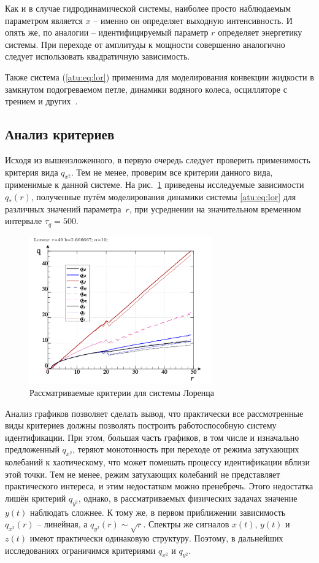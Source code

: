Как и в случае гидродинамической системы, наиболее просто наблюдаемым
параметром является $x$ -- именно он определяет выходную интенсивность. И
опять же, по аналогии -- идентифицируемый параметр $r$ определяет энергетику
системы. При переходе от амплитуды к мощности совершенно аналогично
следует использовать квадратичную зависимость.

Также система (\ref{atu:eq:lor}) применима для
моделирования конвекции жидкости в замкнутом подогреваемом петле,
динамики водяного колеса, осцилляторе с трением и других~\cite{kuznetsov_dyn_chaos}.

\subsection{Анализ критериев}

Исходя из вышеизложенного, в первую очередь следует проверить применимость
критерия вида $q_{x^2}$. Тем не менее, проверим все
критерии данного вида, применимые к данной системе.
На рис.~\ref{atu:f:lor_q} приведены исследуемые зависимости
$q_{*}(r)$, полученные путём моделирования динамики
системы \ref{atu:eq:lor} для различных значений параметра~$r$,
при усреднении на значительном временном интервале $\tau_q=500$.


\begin{figure}[h!]
  \centerline{\includegraphics[width=0.7\textwidth]{p/cha/lor/lor_q-p_q_r.png} }
  \caption{Рассматриваемые критерии для системы Лоренца}
  \label{atu:f:lor_q}
\end{figure}

Анализ графиков позволяет сделать вывод, что практически все
рассмотренные виды критериев должны позволять построить
работоспособную систему идентификации. При этом,
большая часть графиков, в том числе и изначально
предложенный $q_{x^2}$, теряют монотонность
при переходе от режима затухающих колебаний к хаотическому,
что может помешать процессу идентификации вблизи этой точки.
Тем не менее, режим затухающих колебаний не представляет
практического интереса, и этим недостатком можно пренебречь.
Этого недостатка лишён критерий $q_{y^2}$, однако,
в рассматриваемых физических задачах значение
$y(t)$ наблюдать сложнее. К тому же, в первом приближении
зависимость $q_{x^2}(r)$ -- линейная, а
$q_{y^2}(r) \sim \sqrt{r}$.
Спектры же сигналов $x(t)$, $y(t)$ и $z(t)$
имеют практически одинаковую структуру.
Поэтому, в дальнейших исследованиях ограничимся
критериями
$q_{x^2}$ и
$q_{y^2}$.

